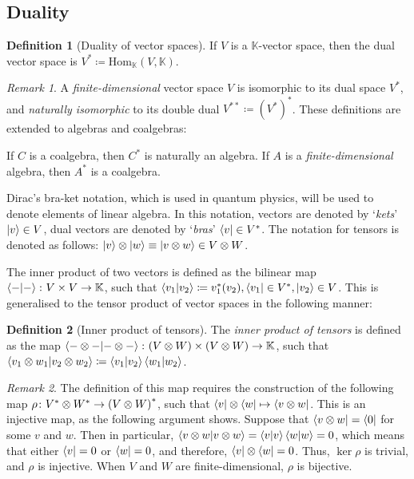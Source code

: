\documentclass[svgnames]{article}
\theoremstyle{definition}
\newtheorem{Definition}{Definition}
\theoremstyle{remark}
\newtheorem*{Remark*}{Remark}
\theoremstyle{underline}
\theoremstyle{underline}
\newcommand{\Hom}{\mathrm{Hom}}
\begin{document}
	\subsection{Duality}

	\begin{Definition}[Duality of vector spaces]
		If $V$ is a $\mathbb K$-vector space, then the dual vector space is $V^* \coloneqq \Hom_{\mathbb K}(V, \mathbb K)$.
	\end{Definition}

	\begin{Remark*}
		A \emph{finite-dimensional} vector space $V$ is isomorphic to its dual space $V^*$, and \emph{naturally isomorphic} to its double dual $V^{**} \coloneqq (V^*)^*$. These definitions are extended to algebras and coalgebras:
		
		If $C$ is a coalgebra, then $C^*$ is naturally an algebra. If $A$ is a \emph{finite-dimensional} algebra, then $A^*$ is a coalgebra.
	\end{Remark*}

	Dirac's bra-ket notation, which is used in quantum physics, will be used to denote elements of linear algebra. In this notation, vectors are denoted by `\emph{kets}' $\ket{v} \in V$, dual vectors are denoted by `\emph{bras}' $\bra{v} \in V^* $. The notation for tensors is denoted as follows: $\ket{v} \otimes \ket{w} \equiv \ket{v \otimes w} \in V \otimes W$.

	The inner product of two vectors is defined as the bilinear map $\braket{-}{-} \colon V \times V \to \mathbb K$, such that $\braket{v_1}{v_2} \coloneqq v_1^*(v_2), \bra{v_1} \in V^*, \ket{v_2} \in V$. This is generalised to the tensor product of vector spaces in the following manner:

	\begin{Definition}[Inner product of tensors]
		The \emph{inner product of tensors} is defined as the map $\braket{- \otimes -}{- \otimes -} \colon \pqty{V \otimes W} \times \pqty{V \otimes W} \to \mathbb K$, such that $ \braket{v_1 \otimes w_1}{v_2 \otimes w_2} \coloneqq \braket{v_1}{v_2}\braket{w_1}{w_2}$.
	\end{Definition} 

	\begin{Remark*}
		The definition of this map requires the construction of the following map $\rho \colon {V^* \otimes W^*} \to \pqty{V \otimes W}^*$, such that $\bra{v} \otimes \bra{w} \mapsto \bra{v \otimes w}$. This is an injective map, as the following argument shows. Suppose that $\bra{v \otimes w} = \bra 0$ for some $v$ and $w$. Then in particular, $\braket{v \otimes w} = \braket v \braket w = 0$, which means that either $\bra v = 0$ or $\bra w = 0$, and therefore, $\bra v \otimes \bra w = 0$. Thus, $\ker \rho$ is trivial, and $\rho$ is injective. When $V$ and $W$ are finite-dimensional, $\rho$ is bijective.
 	\end{Remark*}
\end{document}

